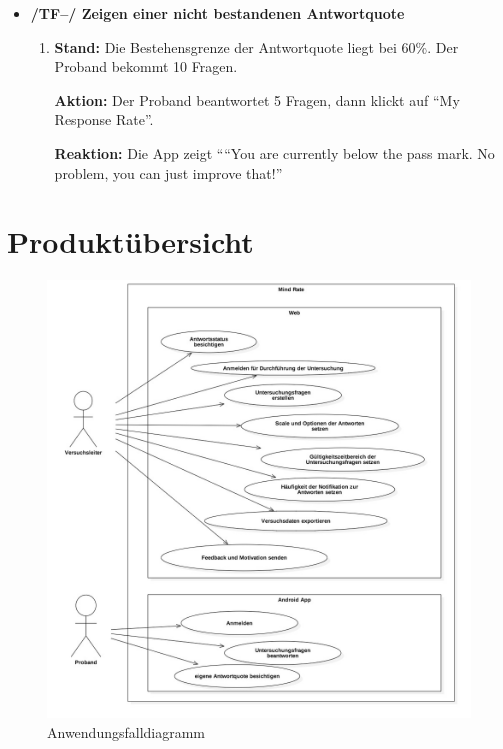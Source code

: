 \documentclass[a4paper]{scrreprt}
\begin{document}
\begin{itemize}
            \item \textbf{/TF--/ Zeigen einer nicht bestandenen Antwortquote}
            \begin{enumerate}
                \item \par \textbf{Stand: }Die Bestehensgrenze der Antwortquote liegt bei 60\%. Der Proband bekommt 10 Fragen.
                \par \textbf{Aktion: }Der Proband beantwortet 5 Fragen, dann klickt auf “My Response Rate”.
                \par \textbf{Reaktion: }Die App zeigt ““You are currently below the pass mark. No problem, you can just improve that!”
            \end{enumerate}

            \end{itemize}

    \chapter{Produktübersicht}
        \begin{figure}
            \centering
            \includegraphics[scale = 0.4]{UseCaseDiagram1.jpg}
            \caption{Anwendungsfalldiagramm}
        \end{figure}


    \glsaddall
    \printglossaries

    \listoffigures
\end{document}
